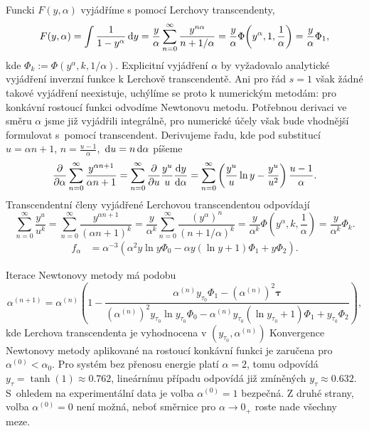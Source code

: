 Funcki $F(y,\alpha)$ vyjádříme s pomocí Lerchovy transcendenty,
\begin{equation}
    F(y,\alpha)=\int\frac{1}{1-y^\alpha}\,\mathrm{d}{y}=\frac{y}{\alpha}\sum_{n=0}^{\infty}\frac{y^{n\alpha}}{n+1/\alpha}=\frac{y}{\alpha}\Phi\!\left(y^\alpha,1,\frac{1}{\alpha}\right)=\frac{y}{\alpha}\Phi_1,
\end{equation}
kde $\Phi_k:=\Phi(y^\alpha,k,1/\alpha)$. 
Explicitní vyjádření $\alpha$ by vyžadovalo analytické vyjádření inverzní funkce k Lerchově transcendentě. Ani pro řád $s=1$ však žádné takové vyjádření neexistuje, uchýlíme se proto k numerickým metodám: pro konkávní rostoucí funkci odvodíme Newtonovu metodu. Potřebnou derivaci ve směru $\alpha$ jsme již vyjádřili integrálně, pro numerické účely však bude vhodnější formulovat s~pomocí transcendent. Derivujeme řadu, kde pod substitucí $u=\alpha n+1$, $n=\frac{u-1}{\alpha}$, $\,\mathrm{d}{u}=n\,\mathrm{d}{\alpha}$ píšeme
\begin{equation}
    \frac{\partial }{\partial \alpha}\sum_{n=0}^{\infty}\frac{y^{\alpha n+1}}{\alpha n +1}
    =\sum_{n=0}^{\infty}\frac{\partial }{\partial u}\frac{y^{u}}{u}\frac{\mathrm{d} y}{\mathrm{d} \alpha}
    =\sum_{n=0}^{\infty}\left(\frac{y^u}{u}\ln{y}-\frac{y^u}{u^2}\right)\frac{u-1}{\alpha}.
\end{equation}
Transcendentní členy vyjádřené Lerchovou transcendentou odpovídají
\begin{equation}
    \sum_{n=0}^{\infty}\frac{y^u}{u^k}=\sum_{n=0}^{\infty}\frac{y^{\alpha n+1}}{(\alpha n +1)^k}=\frac{y}{\alpha^k}\sum_{n=0}^{\infty}\frac{(y^{\alpha})^n}{(n +1/\alpha)^k}=\frac{y}{\alpha^k}\Phi\!\left(y^\alpha,k,\frac{1}{\alpha}\right)=\frac{y}{\alpha^k}\Phi_k.
\end{equation}
\begin{align}
    f_\alpha&=\alpha^{-3}\left(\alpha^2 y\ln{y}\Phi_0-\alpha y(\ln{y}+1)\Phi_1+y\Phi_2\right).
\end{align}

Iterace Newtonovy metody má podobu
\begin{equation}
    \alpha^{(n+1)}=\alpha^{(n)}\left(1-\frac{\alpha^{(n)}y_{\tau_0}\Phi_1-\left(\alpha^{(n)}\right)^2\bm{\tau}}{\left(\alpha^{(n)}\right)^2 y_{\tau_0}\ln{y_{\tau_0}}\Phi_0-\alpha^{(n)}y_{\tau_0}(\ln{y_{\tau_0}}+1)\Phi_1+y_{\tau_0}\Phi_2}\right),
\end{equation}
kde Lerchova transcendenta je vyhodnocena v $(y_{\tau_0},\alpha^{(n)})$
Konvergence Newtonovy metody aplikované na rostoucí konkávní funkci je zaručena pro $\alpha^{(0)}<\alpha_0$. Pro systém bez přenosu energie platí $\alpha=2$, tomu odpovídá $y_\tau=\tanh(1)\approx\num{0.762}$, lineárnímu případu odpovídá již zmíněných $y_\tau\approx\num{0.632}$. S~ohledem na experimentální data je volba $\alpha^{(0)}=1$ bezpečná. Z druhé strany, volba $\alpha^{(0)}=0$ není možná, neboť směrnice pro $\alpha\to0_+$ roste nade všechny meze.

